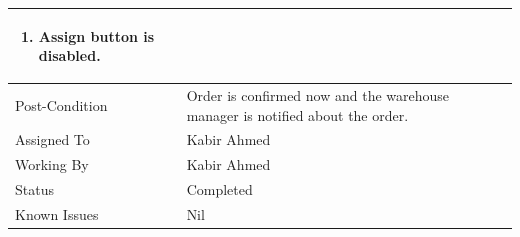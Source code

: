 \documentclass[12pt,a4paper]{article}
\begin{document}
\begin{longtable}{| p{3cm}|p{12cm}|}
 	\begin{enumerate}

		\item Assign button is disabled.

	\end{enumerate}

\\ \hline

Post-Condition &  Order is confirmed now and the warehouse manager is notified about the order.\\ \hline
Assigned To &  Kabir Ahmed
\\ \hline
Working By &   Kabir Ahmed
\\ \hline
Status & 	Completed	
\\ \hline
Known Issues & Nil
\\\hline
\end{longtable}
\end{document}
